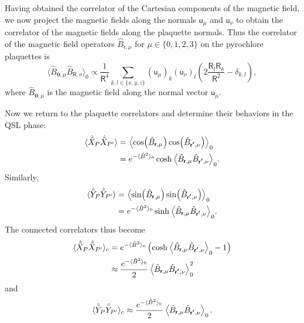 \documentclass[twocolumn,superscriptaddress,amsmath,amssymb,aps,prx,nofootinbib]{revtex4-2}
\newcommand{\dual}[1]{\boldsymbol{\mathsf{#1}}}
\begin{document}
Having obtained the correlator of the Cartesian components of the magnetic field, we now project the magnetic fields along the normals $\dual{u}_\mu$ and $\dual{u}_\nu$ to obtain the correlator of the magnetic fields along the plaquette normals. 
Thus the correlator of the magnetic field operators $\hat{B}_{\dual{r},\mu}$ for $\mu \in \{ 0,1,2,3 \}$ on the pyrochlore plaquettes is
\begin{equation}
    \langle \hat{B}_{\boldsymbol{0},\mu} \hat{B}_{\dual{R},\nu} \rangle_0  \propto \frac{1}{\mathsf{R}^4} \sum_{k,l \in \{x,y,z \} } ( \dual{u}_\mu )_k ( \dual{u}_\nu )_l  \left(  2 \frac{\mathsf{R}_l \mathsf{R}_k}{\mathsf{R}^2} -  \delta_{k,l} \right),
\end{equation}
where $\hat{B}_{\boldsymbol{0},\mu}$ is the magnetic field along the normal vector $\dual{u}_\mu$. 

Now we return to the plaquette correlators and determine their behaviors in the QSL phase:
\begin{equation}
\begin{aligned}
    \langle \hat{\tilde{X}}_P \hat{\tilde{X}}_{P'} \rangle & = \expval{ \cos(\hat{B}_{\dual{r},\mu}) \cos(\hat{B}_{\dual{r'},\nu}) }_0\\
    & = e^{-\langle \hat{B}^2\rangle_0} \cosh{ \expval{\hat{B}_{\dual{r},\mu} \hat{B}_{\dual{r'},\nu}} _0 }.
\end{aligned}
\end{equation}
Similarly,
\begin{equation}
\begin{aligned}
    \langle \hat{\tilde{Y}}_P \hat{\tilde{Y}}_{P'} \rangle & = \expval{ \sin(\hat{B}_{\dual{r},\mu}) \sin(\hat{B}_{\dual{r'},\nu}) }_0\\
    & = e^{-\langle \hat{B}^2\rangle_0} \sinh{ \expval{\hat{B}_{\dual{r},\mu} \hat{B}_{\dual{r'},\nu}} _0 }.
\end{aligned}
\end{equation}
The connected correlators thus become
\begin{equation}
\begin{aligned}
    \langle \hat{\tilde{X}}_P \hat{\tilde{X}}_{P'} \rangle_c &= e^{-\langle \hat{B}^2\rangle_0} \left( \cosh{ \expval{\hat{B}_{\dual{r},\mu} \hat{B}_{\dual{r'},\nu}} _0 } - 1\right)\\
    & \approx \frac{e^{-\langle \hat{B}^2\rangle_0}}{2}   \expval{\hat{B}_{\dual{r},\mu} \hat{B}_{\dual{r'},\nu}}_0^2  
\end{aligned}
\end{equation}
and 
\begin{equation}
    \langle \hat{\tilde{Y}}_P \hat{\tilde{Y}}_{P'} \rangle_c  \approx \frac{e^{-\langle \hat{B}^2\rangle_0}}{2}   \expval{\hat{B}_{\dual{r},\mu} \hat{B}_{\dual{r'},\nu}}_0.  
\end{equation}
\end{document}

